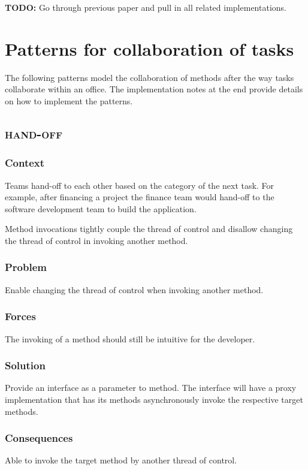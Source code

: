 \documentclass[prodmode]{style/acmlarge}
\begin{document}
\textbf{TODO:} Go through previous paper and pull in all related implementations. 




\section{Patterns for collaboration of tasks}

The following patterns model the collaboration of methods after the way tasks
collaborate within an office.  The implementation notes at the end provide
details on how to implement the patterns.


\subsection{\textsc{\textbf{hand-off}}}

\subsubsection*{Context} Teams hand-off to each other based on the category of
the next task.  For example, after financing a project the finance team would
hand-off to the software development team to build the application.

Method invocations tightly couple the thread of control and disallow changing
the thread of control in invoking another method.

\subsubsection*{Problem} Enable changing the thread of control when invoking
another method.

\subsubsection*{Forces} The invoking of a method should still be intuitive for
the developer.

\subsubsection*{Solution}  Provide an interface as a parameter to method.  The
interface will have a proxy implementation that has its methods asynchronously
invoke the respective target methods.

\subsubsection*{Consequences} Able to invoke the target method by another thread of control.
\end{document}
